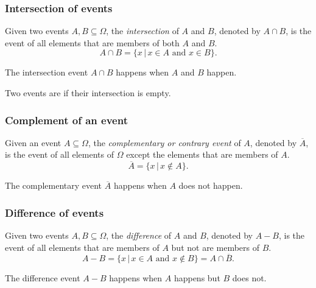 \begin{frame}
\frametitle{Intersection of events}
\begin{definition}
Given two events $A,B\subseteq \Omega$, the \emph{intersection} of $A$ and $B$, denoted by $A\cap B$, is the
event of all elements that are members of both $A$ and $B$.
\[
A\cap B = \{x\,|\, x\in A\mbox{ and }x\in B\}.
\]
\end{definition}

\begin{center}

\end{center}
The intersection event $A\cap B$ happens when $A$ \alert{and} $B$ happen.


Two events are  if their intersection is empty.
\end{frame}


\begin{frame}
\frametitle{Complement of an event}
\begin{definition}
Given an event $A\subseteq \Omega$, the \emph{complementary or contrary event} of $A$, denoted by $\overline A$, is
the event of all elements of $\Omega$ except the elements that are members of $A$.
\[
\overline A = \{x\,|\, x\not\in A\}.
\]
\end{definition}

\begin{center}

\end{center}

The complementary event $\overline A$ happens when $A$ does \alert{not} happen.
\end{frame}


\begin{frame}
\frametitle{Difference of events}
\begin{definition}
Given two events $A,B\subseteq \Omega$, the \emph{difference} of $A$ and $B$, denoted by $A-B$, is the
event of all elements that are members of $A$ but not are members of $B$.
\[
A-B = \{x\,|\, x\in A\mbox{ and }x\not\in B\} = A \cap \overline B.
\]
\end{definition}

\begin{center}

\end{center}

The difference event $A-B$ happens when $A$ happens but $B$ does not.
\end{frame}


